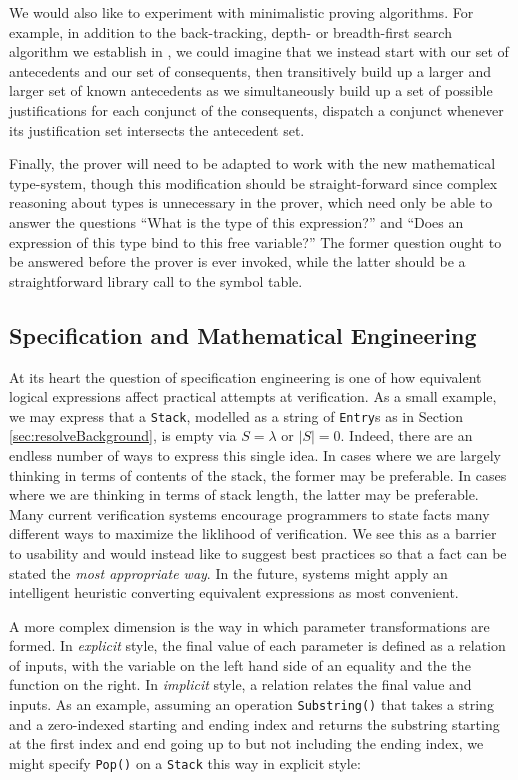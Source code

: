 We would also like to experiment with minimalistic proving algorithms.  For example, in addition to the back-tracking, depth- or breadth-first search algorithm we establish in \cite{smith10}, we could imagine that we instead start with our set of antecedents and our set of consequents, then transitively build up a larger and larger set of known antecedents as we simultaneously build up a set of possible justifications for each conjunct of the consequents, dispatch a conjunct whenever its justification set intersects the antecedent set. 

Finally, the prover will need to be adapted to work with the new mathematical type-system, though this modification should be straight-forward since complex reasoning about types is unnecessary in the prover, which need only be able to answer the questions ``What is the type of this expression?'' and ``Does an expression of this type bind to this free variable?''  The former question ought to be answered before the prover is ever invoked, while the latter should be a straightforward library call to the symbol table.

\subsection{Specification and Mathematical Engineering}
At its heart the question of specification engineering is one of how equivalent logical expressions affect practical attempts at verification.  As a small example, we may express that a \texttt{Stack}, modelled as a string of \texttt{Entry}s as in Section \ref{sec:resolveBackground}, is empty via $S = \lambda$ or $|S| = 0$.  Indeed, there are an endless number of ways to express this single idea.  In cases where we are largely thinking in terms of contents of the stack, the former may be preferable.  In cases where we are thinking in terms of stack length, the latter may be preferable.  Many current verification systems encourage programmers to state facts many different ways to maximize the liklihood of verification.  We see this as a barrier to usability and would instead like to suggest best practices so that a fact can be stated the \emph{most appropriate way}.  In the future, systems might apply an intelligent heuristic converting equivalent expressions as most convenient.

A more complex dimension is the way in which parameter transformations are formed.  In \emph{explicit} style, the final value of each parameter is defined as a relation of inputs, with the variable on the left hand side of an equality and the the function on the right.  In \emph{implicit} style, a relation relates the final value and inputs.  As an example, assuming an operation \texttt{Substring()} that takes a string and a zero-indexed starting and ending index and returns the substring starting at the first index and end going up to but not including the ending index, we might specify \texttt{Pop()} on a \texttt{Stack} this way in explicit style:

